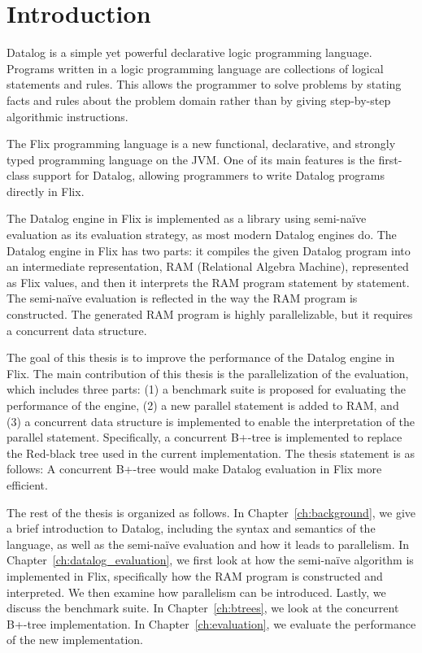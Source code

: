 \documentclass[twoside,11pt,openright]{report}
\theoremstyle{definition}
\begin{document}
\chapter{Introduction}
\label{ch:intro}

Datalog is a simple yet powerful declarative logic programming language. Programs written in a logic programming language are collections of logical statements and rules. This allows the programmer to solve problems by stating facts and rules about the problem domain rather than by giving step-by-step algorithmic instructions.

The Flix programming language is a new functional, declarative, and strongly typed programming language on the JVM. One of its main features is the first-class support for Datalog, allowing programmers to write Datalog programs directly in Flix.

The Datalog engine in Flix is implemented as a library using semi-naïve evaluation as its evaluation strategy, as most modern Datalog engines do. The Datalog engine in Flix has two parts: it compiles the given Datalog program into an intermediate representation, RAM (Relational Algebra Machine), represented as Flix values, and then it interprets the RAM program statement by statement. The semi-naïve evaluation is reflected in the way the RAM program is constructed. The generated RAM program is highly parallelizable, but it requires a concurrent data structure.

The goal of this thesis is to improve the performance of the Datalog engine in Flix. The main contribution of this thesis is the parallelization of the evaluation, which includes three parts: (1) a benchmark suite is proposed for evaluating the performance of the engine, (2) a new parallel statement is added to RAM, and (3) a concurrent data structure is implemented to enable the interpretation of the parallel statement. Specifically, a concurrent B+-tree is implemented to replace the Red-black tree used in the current implementation. The thesis statement is as follows: A concurrent B+-tree would make Datalog evaluation in Flix more efficient.

The rest of the thesis is organized as follows. In Chapter~\ref{ch:background}, we give a brief introduction to Datalog, including the syntax and semantics of the language, as well as the semi-naïve evaluation and how it leads to parallelism. In Chapter~\ref{ch:datalog_evaluation}, we first look at how the semi-naïve algorithm is implemented in Flix, specifically how the RAM program is constructed and interpreted. We then examine how parallelism can be introduced. Lastly, we discuss the benchmark suite. In Chapter~\ref{ch:btrees}, we look at the concurrent B+-tree implementation. In Chapter~\ref{ch:evaluation}, we evaluate the performance of the new implementation.
\end{document}
